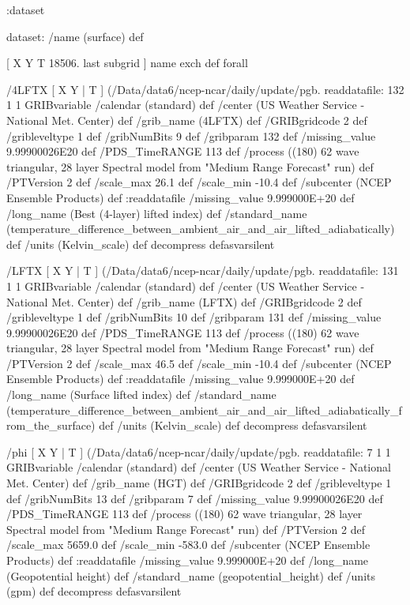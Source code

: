 \begin{ingrid}
 :dataset

 dataset: /name (surface) def 

  [ X Y T 18506. last subgrid ] { name exch def } forall

  /4LFTX { [ X Y | T ] (/Data/data6/ncep-ncar/daily/update/pgb.%
  readdatafile:
  132 1 1 GRIBvariable
  /calendar (standard) def
  /center (US Weather Service - National Met. Center) def
  /grib_name (4LFTX) def
  /GRIBgridcode 2 def
  /gribleveltype 1 def
  /gribNumBits 9 def
  /gribparam 132 def
  /missing_value 9.99900026E20 def
  /PDS_TimeRANGE 113 def
  /process ((180) 62 wave triangular, 28 layer Spectral model from "Medium Range Forecast" run) def
  /PTVersion 2 def
  /scale_max 26.1 def
  /scale_min -10.4 def
  /subcenter (NCEP Ensemble Products) def
  :readdatafile
  /missing_value 9.999000E+20 def
  /long_name (Best (4-layer) lifted index) def
  /standard_name (temperature_difference_between_ambient_air_and_air_lifted_adiabatically) def
  /units (Kelvin_scale) def
  decompress
  } defasvarsilent

  /LFTX { [ X Y | T ] (/Data/data6/ncep-ncar/daily/update/pgb.%
  readdatafile:
  131 1 1 GRIBvariable
  /calendar (standard) def
  /center (US Weather Service - National Met. Center) def
  /grib_name (LFTX) def
  /GRIBgridcode 2 def
  /gribleveltype 1 def
  /gribNumBits 10 def
  /gribparam 131 def
  /missing_value 9.99900026E20 def
  /PDS_TimeRANGE 113 def
  /process ((180) 62 wave triangular, 28 layer Spectral model from "Medium Range Forecast" run) def
  /PTVersion 2 def
  /scale_max 46.5 def
  /scale_min -10.4 def
  /subcenter (NCEP Ensemble Products) def
  :readdatafile
  /missing_value 9.999000E+20 def
  /long_name (Surface lifted index) def
  /standard_name (temperature_difference_between_ambient_air_and_air_lifted_adiabatically_from_the_surface) def
  /units (Kelvin_scale) def
  decompress
  } defasvarsilent

  /phi { [ X Y | T ] (/Data/data6/ncep-ncar/daily/update/pgb.%
  readdatafile:
  7 1 1 GRIBvariable
  /calendar (standard) def
  /center (US Weather Service - National Met. Center) def
  /grib_name (HGT) def
  /GRIBgridcode 2 def
  /gribleveltype 1 def
  /gribNumBits 13 def
  /gribparam 7 def
  /missing_value 9.99900026E20 def
  /PDS_TimeRANGE 113 def
  /process ((180) 62 wave triangular, 28 layer Spectral model from "Medium Range Forecast" run) def
  /PTVersion 2 def
  /scale_max 5659.0 def
  /scale_min -583.0 def
  /subcenter (NCEP Ensemble Products) def
  :readdatafile
  /missing_value 9.999000E+20 def
  /long_name (Geopotential height) def
  /standard_name (geopotential_height) def
  /units (gpm) def
  decompress
  } defasvarsilent


\end{ingrid}
